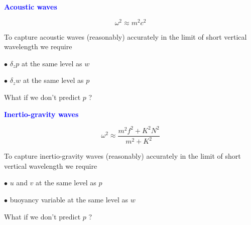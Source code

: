 \documentclass[a4]{seminar}
\newcommand{\B}[1]{\textcolor{blue}{#1}}
\begin{document}
\begin{slide}

\B{\bf Acoustic waves}

\begin{displaymath}
\omega^2 \approx m^2 c^2
\end{displaymath}


\vspace{3mm}

To capture acoustic waves (reasonably) accurately in the limit
of short vertical wavelength we require

\vspace{2mm}

\( \bullet \) \( \delta_z p \) at the same level as \( w \)

\vspace{2mm}

\( \bullet \) \( \delta_z w \) at the same level as \( p \)

\vspace{4mm}

What if we don't predict \( p \) ?


\end{slide}


\begin{slide}

\B{\bf Inertio-gravity waves}

\begin{displaymath}
\omega^2 \approx \frac{ m^2 f^2 + K^2 N^2 }{m^2 + K^2}
\end{displaymath}


\vspace{3mm}

To capture inertio-gravity waves (reasonably) accurately in the limit
of short vertical wavelength we require

\vspace{2mm}

\( \bullet \) \( u \) and \( v \) at the same level as \( p \)

\vspace{2mm}

\( \bullet \) buoyancy variable at the same level as \( w \)


\vspace{4mm}

What if we don't predict \( p \) ?



\end{slide}
\end{document}
